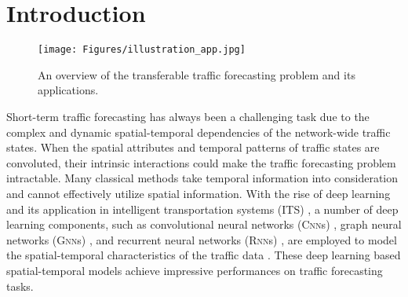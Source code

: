 \documentclass[sigconf]{acmart}
\theoremstyle{definition}
\begin{document}





\maketitle

\section{Introduction}
\label{sec:intro}


\begin{figure}[t]
    \centering
    \texttt{[image: Figures/illustration\_app.jpg]}
    \caption{An overview of the transferable traffic forecasting problem and its applications.} 
\label{fig:illustration}
\end{figure}

Short-term traffic forecasting \cite{jiang2021graph,bolshinsky2012traffic} has always been a challenging task due to the complex and dynamic spatial-temporal dependencies of the network-wide traffic states. When the spatial attributes and temporal patterns of traffic states are convoluted, their intrinsic interactions could make the traffic forecasting problem intractable. 
Many classical methods \cite{williams2003modeling,drucker1997support} take temporal information into consideration and cannot effectively utilize spatial information. 
With the rise of deep learning and its application in intelligent transportation systems (ITS) \cite{dai2020hybrid,barnes2020bustr,zhang2020curb}, a number of deep learning components, such as convolutional neural networks (\textsc{Cnn}s) \cite{o2015introduction}, graph neural networks (\textsc{Gnn}s) \cite{kipf2016semi}, and recurrent neural networks (\textsc{Rnn}s) \cite{fu2016using}, are employed to model the spatial-temporal characteristics of the traffic data \cite{song2020spatial,du2017traffic,guo2019attention,cai2020traffic,li2021dynamic}. These deep learning based spatial-temporal models achieve impressive performances on traffic forecasting tasks.
\end{document}
